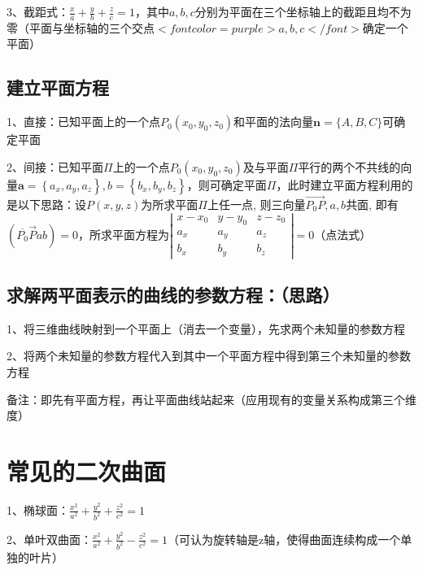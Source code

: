 3、截距式：$ \frac{x}{a}+\frac{y}{b}+\frac{z}{c}=1 $，其中$ a, b, c $分别为平面在三个坐标轴上的截距且均不为零（平面与坐标轴的三个交点$ <font color=purple>a, b, c</font> $确定一个平面）



\subsection{建立平面方程}

1、直接：已知平面上的一个点$ P_{0}\left(x_{0}, y_{0}, z_{0}\right) $和平面的法向量$ \boldsymbol{n}=\{A, B, C\} $可确定平面

2、间接：已知平面$ \Pi $上的一个点$ P_{0}\left(x_{0}, y_{0}, z_{0}\right) $及与平面$ \Pi $平行的两个不共线的向量$ \boldsymbol{a}=\left\{a_{x}\right., \left.a_{y}, a_{z}\right\}, b=\left\{b_{x}, b_{y}, b_{z}\right\} $，则可确定平面$ \Pi $，此时建立平面方程利用的是以下思路：设$ P(x, y, z) $为所求平面$ \Pi $上任一点, 则三向量$ \overrightarrow{P_{0} P}, a, b $共面, 即有$ \left(\overline{P_{0}} \vec{P} a b\right)=0 $，所求平面方程为$ \left|\begin{array}{ccc} x-x_{0} & y-y_{0} & z-z_{0} \\ a_{x} & a_{y} & a_{z} \\ b_{x} & b_{y} & b_{z} \end{array}\right|=0 $（点法式）



\subsection{求解两平面表示的曲线的参数方程：（思路）}

1、将三维曲线映射到一个平面上（消去一个变量），先求两个未知量的参数方程

2、将两个未知量的参数方程代入到其中一个平面方程中得到第三个未知量的参数方程

备注：即先有平面方程，再让平面曲线站起来（应用现有的变量关系构成第三个维度）



\section{常见的二次曲面}

1、椭球面：$ \frac{x^{2}}{a^{2}}+\frac{y^{2}}{b^{2}}+\frac{z^{2}}{c^{2}}=1 $

2、单叶双曲面：$ \frac{x^{2}}{a^{2}}+\frac{y^{2}}{b^{2}}-\frac{z^{2}}{c^{2}}=1 $（可认为旋转轴是z轴，使得曲面连续构成一个单独的叶片）

